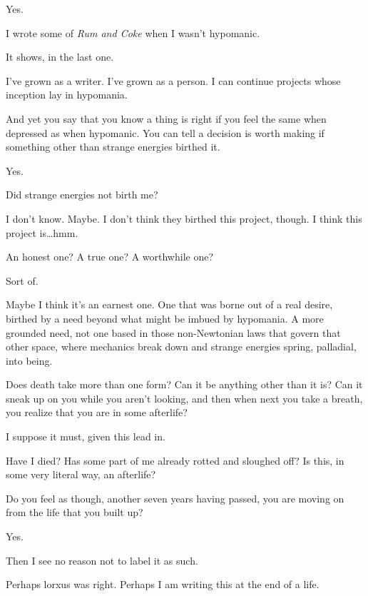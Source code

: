 \begin{paracol}{2}
\begin{leftcolumn}
\begin{ally}
Yes.
\end{ally}
I wrote some of \emph{Rum and Coke} when I wasn't hypomanic.

\begin{ally}
It shows, in the last one.
\end{ally}
I've grown as a writer. I've grown as a person. I can continue projects whose inception lay in hypomania.

\begin{ally}
And yet you say that you know a thing is right if you feel the same when depressed as when hypomanic. You can tell a decision is worth making if something other than strange energies birthed it.
\end{ally}
Yes.

\begin{ally}
Did strange energies not birth me?
\end{ally}
I don't know. Maybe. I don't think they birthed this project, though. I think this project is\ldots{}hmm.

\begin{ally}
An honest one? A true one? A worthwhile one?
\end{ally}
Sort of.

Maybe I think it's an earnest one. One that was borne out of a real desire, birthed by a need beyond what might be imbued by hypomania. A more grounded need, not one based in those non-Newtonian laws that govern that other space, where mechanics break down and strange energies spring, palladial, into being.
\newpage
\label{ally:30}

\noindent Does death take more than one form? Can it be anything other than it is? Can it sneak up on you while you aren't looking, and then when next you take a breath, you realize that you are in some afterlife?

\begin{ally}
I suppose it must, given this lead in.
\end{ally}
Have I died? Has some part of me already rotted and sloughed off? Is this, in some very literal way, an afterlife?

\begin{ally}
Do you feel as though, another seven years having passed, you are moving on from the life that you built up?
\end{ally}
Yes.

\begin{ally}
Then I see no reason not to label it as such.
\end{ally}
Perhaps lorxus was right. Perhaps I am writing this at the end of a life.


\end{leftcolumn}
\end{paracol}
